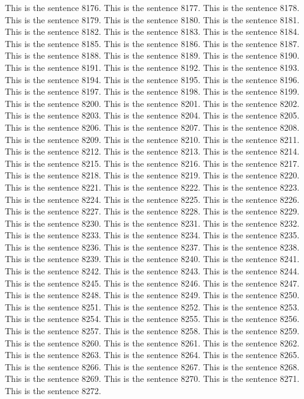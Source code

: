 \documentclass{article}
\begin{document}
This is the sentence 8176.
This is the sentence 8177.
This is the sentence 8178.
This is the sentence 8179.
This is the sentence 8180.
This is the sentence 8181.
This is the sentence 8182.
This is the sentence 8183.
This is the sentence 8184.
This is the sentence 8185.
This is the sentence 8186.
This is the sentence 8187.
This is the sentence 8188.
This is the sentence 8189.
This is the sentence 8190.
This is the sentence 8191.
This is the sentence 8192.
This is the sentence 8193.
This is the sentence 8194.
This is the sentence 8195.
This is the sentence 8196.
This is the sentence 8197.
This is the sentence 8198.
This is the sentence 8199.
This is the sentence 8200.
This is the sentence 8201.
This is the sentence 8202.
This is the sentence 8203.
This is the sentence 8204.
This is the sentence 8205.
This is the sentence 8206.
This is the sentence 8207.
This is the sentence 8208.
This is the sentence 8209.
This is the sentence 8210.
This is the sentence 8211.
This is the sentence 8212.
This is the sentence 8213.
This is the sentence 8214.
This is the sentence 8215.
This is the sentence 8216.
This is the sentence 8217.
This is the sentence 8218.
This is the sentence 8219.
This is the sentence 8220.
This is the sentence 8221.
This is the sentence 8222.
This is the sentence 8223.
This is the sentence 8224.
This is the sentence 8225.
This is the sentence 8226.
This is the sentence 8227.
This is the sentence 8228.
This is the sentence 8229.
This is the sentence 8230.
This is the sentence 8231.
This is the sentence 8232.
This is the sentence 8233.
This is the sentence 8234.
This is the sentence 8235.
This is the sentence 8236.
This is the sentence 8237.
This is the sentence 8238.
This is the sentence 8239.
This is the sentence 8240.
This is the sentence 8241.
This is the sentence 8242.
This is the sentence 8243.
This is the sentence 8244.
This is the sentence 8245.
This is the sentence 8246.
This is the sentence 8247.
This is the sentence 8248.
This is the sentence 8249.
This is the sentence 8250.
This is the sentence 8251.
This is the sentence 8252.
This is the sentence 8253.
This is the sentence 8254.
This is the sentence 8255.
This is the sentence 8256.
This is the sentence 8257.
This is the sentence 8258.
This is the sentence 8259.
This is the sentence 8260.
This is the sentence 8261.
This is the sentence 8262.
This is the sentence 8263.
This is the sentence 8264.
This is the sentence 8265.
This is the sentence 8266.
This is the sentence 8267.
This is the sentence 8268.
This is the sentence 8269.
This is the sentence 8270.
This is the sentence 8271.
This is the sentence 8272.
\end{document}
